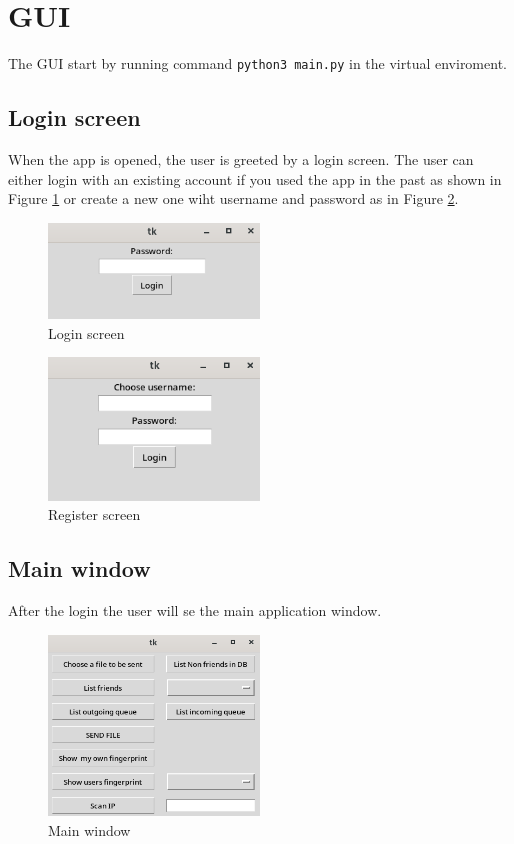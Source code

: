 \section{GUI}
The GUI start by running command \texttt{python3 main.py} in the virtual enviroment.

\subsection{Login screen}
When the app is opened, the user is greeted by a login screen. The user can either login with an existing account if you used the app in the past as shown in Figure \ref{fig:login}
or create a new one wiht username and password as in Figure \ref{fig:reg}.
\begin{figure}[h]
    \centering
    \includegraphics[width=0.5\textwidth]{images/login.png}
    \caption{Login screen}
    \label{fig:login}
\end{figure}

\begin{figure}[h]
    \centering
    \includegraphics[width=0.5\textwidth]{images/register.png}
    \caption{Register screen}
    \label{fig:reg}
\end{figure}

\newpage

\subsection{Main window}
After the login the user will se the main application window. 
\begin{figure}[h]
    \centering
    \includegraphics[width=0.5\textwidth]{images/mainwindow.png}
    \caption{Main window}
    \label{fig:main}
\end{figure}

